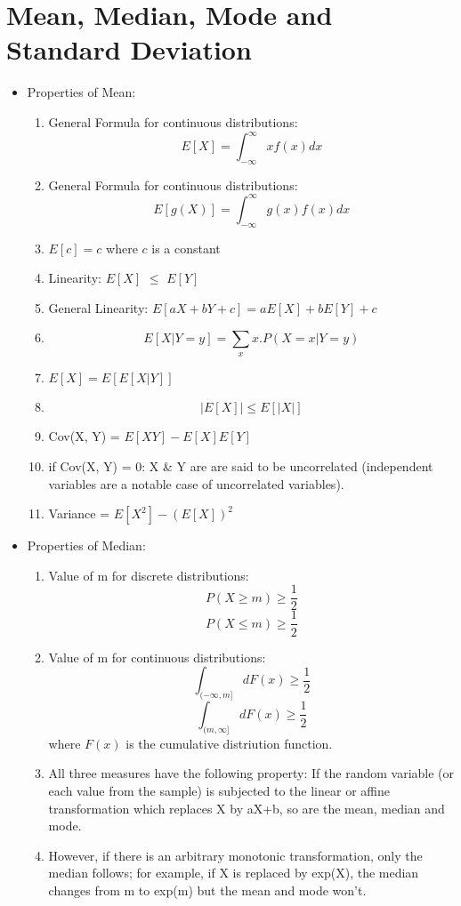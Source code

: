 \documentclass[a4paper,oneside]{book}
\begin{document}
\section{Mean, Median, Mode and Standard Deviation}
\begin{itemize}
\item Properties of Mean:
\begin{enumerate}
\item General Formula for continuous distributions: $$E\left[X\right] = \int_{-\infty}^{\infty} x f(x) dx$$
\item General Formula for continuous distributions: $$E\left[g(X)\right] = \int_{-\infty}^{\infty} g(x) f(x) dx$$
\item $E\left[c\right] = c $ where $c$ is a constant
\item Linearity: $E \left[X \right]$ $\leq$ $E \left[Y \right]$
\item General Linearity: $E \left[aX + bY + c\right] = aE\left[X\right] + bE\left[Y\right] + c$
\item $$ E\left[X | Y = y\right] = \sum_{x} x.P(X = x| Y = y)$$
\item $E\left[X\right] = E\left[E\left[X|Y\right]\right]$
\item $$ \left|E\left[X\right]\right| \leq E\left[\left|X\right|\right]$$
\item Cov(X, Y) = $E\left[XY\right] - E\left[X\right]E\left[Y\right]$
\item if Cov(X, Y) = 0: X \& Y are are said to be uncorrelated (independent variables are a notable case of uncorrelated variables).
\item Variance = $E\left[X^{2}\right] - (E\left[X\right])^{2}$
\end{enumerate}
\item Properties of Median:
\begin{enumerate}
\item Value of m for discrete distributions:
$$ P(X \geq m) \geq \dfrac{1}{2}$$
$$ P(X \leq m) \geq \dfrac{1}{2} $$
\item Value of m for continuous distributions:
$$ \int_{(-\infty, m]} dF(x) \geq \dfrac{1}{2}$$
$$ \int_{(m, \infty]} dF(x) \geq \dfrac{1}{2} $$
where $F(x)$ is the cumulative distriution function.
\item All three measures have the following property: If the random variable (or each value from the sample) is subjected to the linear or affine transformation which replaces X by aX+b, so are the mean, median and mode.
\item However, if there is an arbitrary monotonic transformation, only the median follows; for example, if X is replaced by exp(X), the median changes from m to exp(m) but the mean and mode won't.

\end{enumerate}
\end{itemize}
\end{document}

